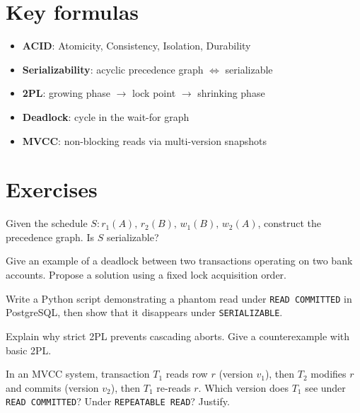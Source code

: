 \section{Key formulas}

\begin{keyformulas}
\begin{itemize}
  \item \textbf{ACID}: Atomicity, Consistency, Isolation, Durability
  \item \textbf{Serializability}: acyclic precedence graph $\Leftrightarrow$ serializable
  \item \textbf{2PL}: growing phase $\to$ lock point $\to$ shrinking phase
  \item \textbf{Deadlock}: cycle in the wait-for graph
  \item \textbf{MVCC}: non-blocking reads via multi-version snapshots
\end{itemize}
\end{keyformulas}

\section{Exercises}

\begin{exercise}
Given the schedule $S : r_1(A),\, r_2(B),\, w_1(B),\, w_2(A)$, construct
the precedence graph. Is $S$ serializable?
\end{exercise}

\begin{exercise}
Give an example of a deadlock between two transactions operating on two
bank accounts. Propose a solution using a fixed lock acquisition order.
\end{exercise}

\begin{exercise}
Write a Python script demonstrating a phantom read under \texttt{READ
COMMITTED} in PostgreSQL, then show that it disappears under
\texttt{SERIALIZABLE}.
\end{exercise}

\begin{exercise}
Explain why strict 2PL prevents cascading aborts. Give a counterexample
with basic 2PL.
\end{exercise}

\begin{exercise}
In an MVCC system, transaction $T_1$ reads row $r$ (version $v_1$), then
$T_2$ modifies $r$ and commits (version $v_2$), then $T_1$ re-reads $r$.
Which version does $T_1$ see under \texttt{READ COMMITTED}? Under
\texttt{REPEATABLE READ}? Justify.
\end{exercise}

